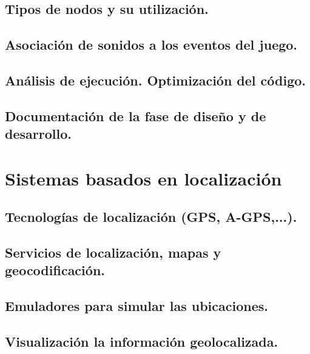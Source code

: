\documentclass[a4paper,12pt,spanish]{sphinxmanual}
\begin{document}
\section{Tipos de nodos y su utilización.}
\label{index:tipos-de-nodos-y-su-utilizacion}

\section{Asociación de sonidos a los eventos del juego.}
\label{index:asociacion-de-sonidos-a-los-eventos-del-juego}

\section{Análisis de ejecución. Optimización del código.}
\label{index:analisis-de-ejecucion-optimizacion-del-codigo}

\section{Documentación de la fase de diseño y de desarrollo.}
\label{index:documentacion-de-la-fase-de-diseno-y-de-desarrollo}

\chapter{Sistemas basados en localización}
\label{index:sistemas-basados-en-localizacion}

\section{Tecnologías de localización (GPS, A-GPS,...).}
\label{index:tecnologias-de-localizacion-gps-a-gps}

\section{Servicios de localización, mapas y geocodificación.}
\label{index:servicios-de-localizacion-mapas-y-geocodificacion}

\section{Emuladores para simular las ubicaciones.}
\label{index:emuladores-para-simular-las-ubicaciones}

\section{Visualización la información geolocalizada.}
\label{index:visualizacion-la-informacion-geolocalizada}


\renewcommand{\indexname}{Índice}
\printindex
\end{document}
